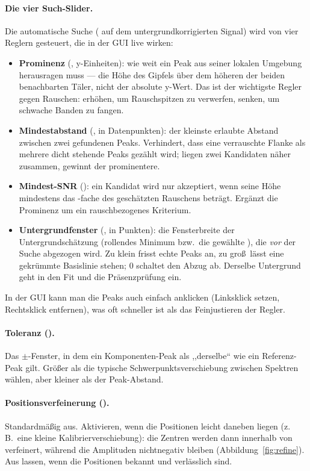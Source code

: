 \documentclass[11pt,a4paper]{article}
\begin{document}
\paragraph{Die vier Such-Slider.} Die automatische Suche
( auf dem untergrundkorrigierten Signal) wird von
vier Reglern gesteuert, die in der GUI live wirken:
\begin{itemize}
\item \textbf{Prominenz} (, y-Einheiten): wie weit ein
  Peak aus seiner lokalen Umgebung herausragen muss --- die H\"ohe des Gipfels
  \"uber dem h\"oheren der beiden benachbarten T\"aler, nicht der absolute
  y-Wert. Das ist der wichtigste Regler gegen Rauschen: erh\"ohen, um
  Rauschspitzen zu verwerfen, senken, um schwache Banden zu fangen.
\item \textbf{Mindestabstand} (, in Datenpunkten): der
  kleinste erlaubte Abstand zwischen zwei gefundenen Peaks. Verhindert, dass
  eine verrauschte Flanke als mehrere dicht stehende Peaks gez\"ahlt wird;
  liegen zwei Kandidaten n\"aher zusammen, gewinnt der prominentere.
\item \textbf{Mindest-SNR} (): ein Kandidat wird nur
  akzeptiert, wenn seine H\"ohe mindestens das -fache des
  gesch\"atzten Rauschens betr\"agt. Erg\"anzt die Prominenz um ein
  rauschbezogenes Kriterium.
\item \textbf{Untergrundfenster} (, in Punkten): die Fenster\-breite
  der Untergrundsch\"atzung (rollendes Minimum bzw.\ die gew\"ahlte
  ), die \emph{vor} der Suche abgezogen wird. Zu klein
  frisst echte Peaks an, zu gro\ss\ l\"asst eine gekr\"ummte Basislinie stehen;
  $0$ schaltet den Abzug ab. Derselbe Untergrund geht in den Fit und die
  Pr\"asenzpr\"ufung ein.
\end{itemize}
In der GUI kann man die Peaks auch einfach anklicken (Linksklick setzen,
Rechtsklick entfernen), was oft schneller ist als das Feinjustieren der Regler.

\paragraph{Toleranz ().} Das $\pm$-Fenster, in dem ein
Komponenten-Peak als ,,derselbe`` wie ein Referenz-Peak gilt. Gr\"o\ss er als die
typische Schwerpunktsverschiebung zwischen Spektren w\"ahlen, aber kleiner als der
Peak-Abstand.

\paragraph{Positionsverfeinerung ().} Standardm\"a\ss ig aus.
Aktivieren, wenn die Positionen leicht daneben liegen (z.\,B.\ eine kleine
Kalibrierverschiebung): die Zentren werden dann innerhalb von 
verfeinert, w\"ahrend die Amplituden nichtnegativ bleiben
(Abbildung~\ref{fig:refine}). Aus lassen, wenn die Positionen bekannt und
verl\"asslich sind.
\end{document}
